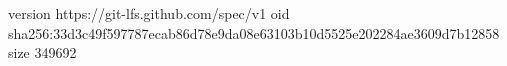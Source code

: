 version https://git-lfs.github.com/spec/v1
oid sha256:33d3c49f597787ecab86d78e9da08e63103b10d5525e202284ae3609d7b12858
size 349692
